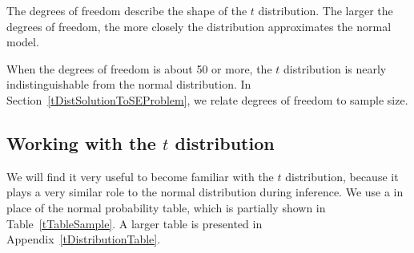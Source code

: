 \begin{termBox}{
The degrees of freedom describe the shape of the $t$ distribution. The larger the degrees of freedom, the more closely the distribution approximates the normal model.}
\end{termBox}

When the degrees of freedom is about 50 or more, the $t$ distribution is nearly indistinguishable from the normal distribution. In Section~\ref{tDistSolutionToSEProblem}, we relate degrees of freedom to sample size.

\subsection{Working with the $t$ distribution}

We will find it very useful to become familiar with the $t$ distribution, because it plays a very similar role to the normal distribution during inference. We use a  in place of the normal probability table, which is partially shown in Table~\ref{tTableSample}. A larger table is presented in Appendix~\vref{tDistributionTable}.

